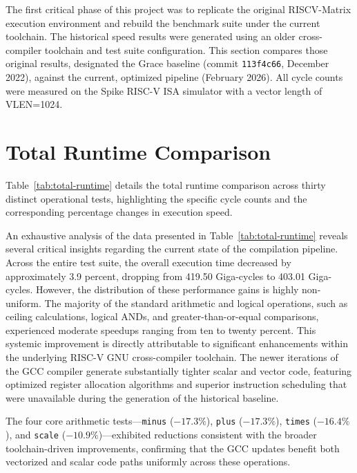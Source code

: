 
The first critical phase of this project was to replicate the original RISCV-Matrix execution environment and rebuild the benchmark suite under the current toolchain. The historical speed results were generated using an older cross-compiler toolchain and test suite configuration. This section compares those original results, designated the Grace baseline (commit \texttt{113f4c66}, December 2022), against the current, optimized pipeline (February 2026). All cycle counts were measured on the Spike RISC-V ISA simulator with a vector length of VLEN=1024.

\section{Total Runtime Comparison}

Table~\ref{tab:total-runtime} details the total runtime comparison across thirty distinct operational tests, highlighting the specific cycle counts and the corresponding percentage changes in execution speed.



An exhaustive analysis of the data presented in Table~\ref{tab:total-runtime} reveals several critical insights regarding the current state of the compilation pipeline. Across the entire test suite, the overall execution time decreased by approximately 3.9 percent, dropping from 419.50 Giga-cycles to 403.01 Giga-cycles. However, the distribution of these performance gains is highly non-uniform. The majority of the standard arithmetic and logical operations, such as ceiling calculations, logical ANDs, and greater-than-or-equal comparisons, experienced moderate speedups ranging from ten to twenty percent. This systemic improvement is directly attributable to significant enhancements within the underlying RISC-V GNU cross-compiler toolchain. The newer iterations of the GCC compiler generate substantially tighter scalar and vector code, featuring optimized register allocation algorithms and superior instruction scheduling that were unavailable during the generation of the historical baseline.

The four core arithmetic tests---\texttt{minus} ($-17.3\%$), \texttt{plus} ($-17.3\%$), \texttt{times} ($-16.4\%$), and \texttt{scale} ($-10.9\%$)---exhibited reductions consistent with the broader toolchain-driven improvements, confirming that the GCC updates benefit both vectorized and scalar code paths uniformly across these operations.

